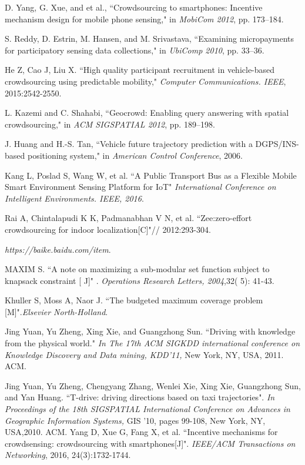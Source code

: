 \documentclass[journal]{IEEEtran}
\begin{document}
\begin{thebibliography}{1}
D. Yang, G. Xue, and et al., ``Crowdsourcing to smartphones: Incentive mechanism design for mobile phone sensing," in\textit{ MobiCom 2012}, pp. 173–184.

S. Reddy, D. Estrin, M. Hansen, and M. Srivastava, ``Examining micropayments for participatory sensing data collections," in \textit{UbiComp 2010}, pp. 33–36.

He Z, Cao J, Liu X. ``High quality participant recruitment in vehicle-based crowdsourcing using predictable mobility," \textit{Computer Communications. IEEE}, 2015:2542-2550.

L. Kazemi and C. Shahabi, ``Geocrowd: Enabling query answering with spatial crowdsourcing," in \textit{ACM SIGSPATIAL 2012}, pp. 189–198.

J. Huang and H.-S. Tan, ``Vehicle future trajectory prediction with a DGPS/INS-based positioning system," in \textit{American Control Conference}, 2006.

 Kang L, Poslad S, Wang W, et al. ``A Public Transport Bus as a Flexible Mobile Smart Environment Sensing Platform for IoT" \textit{ International Conference on Intelligent Environments. IEEE, 2016}.
 
 Rai A, Chintalapudi K K, Padmanabhan V N, et al. ``Zee:zero-effort crowdsourcing for indoor localization[C]"// 2012:293-304.
 
\textit{https://baike.baidu.com/item}.

 MAXIM S. ``A note on maximizing a sub-modular set function subject to knapsack constraint [ J]" . \textit{Operations Research Letters, 2004},32( 5): 41-43.
 
Khuller S, Moss A, Naor J. ``The budgeted maximum coverage problem [M]".\textit{Elsevier North-Holland}.

Jing Yuan, Yu Zheng, Xing Xie, and Guangzhong Sun. ``Driving with knowledge from the physical world." \textit{In The 17th ACM SIGKDD international conference on Knowledge Discovery and Data mining, KDD’11,} New York, NY, USA, 2011. ACM.

Jing Yuan, Yu Zheng, Chengyang Zhang, Wenlei Xie, Xing Xie, Guangzhong Sun, and Yan Huang. ``T-drive: driving directions based on taxi trajectories". \textit{In Proceedings of the 18th SIGSPATIAL International Conference on Advances in Geographic Information Systems,} GIS ’10, pages 99-108, New York, NY, USA,2010. ACM.
Yang D, Xue G, Fang X, et al. ``Incentive mechanisms for crowdsensing: crowdsourcing with smartphones[J]". \textit{IEEE/ACM Transactions on Networking}, 2016, 24(3):1732-1744.

\end{thebibliography}
\end{document}
